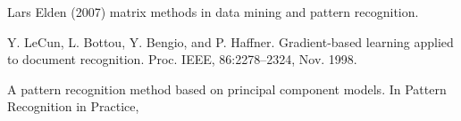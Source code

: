 	\setLTRbibitems
	\begin{thebibliography}{9}
		Lars Elden (2007) matrix methods in data mining and pattern recognition.
		
		Y. LeCun, L. Bottou, Y. Bengio, and P. Haﬀner. Gradient-based learning
		applied to document recognition. Proc. IEEE, 86:2278–2324, Nov. 1998.
		
		A pattern recognition method based
		on principal component models. In Pattern Recognition in Practice,
	\end{thebibliography}
	\pagebreak
